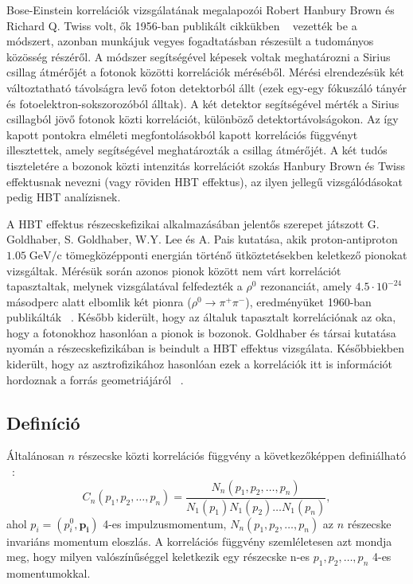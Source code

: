 \documentclass[10pt,a4paper]{article}
\numberwithin{equation}{subsection}
\numberwithin{figure}{section}
\begin{document}
Bose-Einstein korrelációk vizsgálatának megalapozói Robert Hanbury Brown és Richard Q. Twiss volt, ők 1956-ban publikált cikkükben ~\cite{HanburyBrown:1956bqd} vezették be a módszert, azonban munkájuk vegyes fogadtatásban részesült a tudományos közösség részéről. A módszer segítségével képesek voltak meghatározni a Sirius csillag átmérőjét a fotonok közötti korrelációk méréséből. Mérési elrendezésük két változtatható távolságra levő foton detektorból állt (ezek egy-egy fókuszáló tányér és fotoelektron-sokszorozóból álltak). A két detektor segítségével mérték a Sirius csillagból jövő fotonok közti korrelációt, különböző detektortávolságokon. Az így kapott pontokra elméleti megfontolásokból kapott korrelációs függvényt illesztettek, amely segítségével meghatározták a csillag átmérőjét. A két tudós tiszteletére a bozonok közti intenzitás korrelációt szokás Hanbury Brown és Twiss effektusnak nevezni (vagy röviden HBT effektus), az ilyen jellegű vizsgálódásokat pedig HBT analízisnek.

A HBT effektus részecskefizikai alkalmazásában jelentős szerepet játszott G. Goldhaber, S. Goldhaber, W.Y. Lee és A. Pais kutatása, akik proton-antiproton $1.05\;\mathrm{GeV/c}$ tömegközépponti energián történő ütköztetésekben keletkező pionokat vizsgáltak. Mérésük során azonos pionok között nem várt korrelációt tapasztaltak, melynek vizsgálatával felfedezték a $\rho^0$ rezonanciát, amely $4.5\cdot 10^{-24}$ másodperc alatt elbomlik két pionra ($\rho^0\rightarrow \pi^+\pi^-$), eredményüket 1960-ban publikálták ~\cite{Goldhaber:1960sf}. Később kiderült, hogy az általuk tapasztalt korrelációnak az oka, hogy a fotonokhoz hasonlóan a pionok is bozonok. Goldhaber és társai kutatása nyomán a részecskefizikában is beindult a HBT effektus vizsgálata. Későbbiekben kiderült, hogy az asztrofizikához hasonlóan ezek a korrelációk itt is információt hordoznak a forrás geometriájáról ~\cite{Padula:2004ba, CsanadHabil}. 


\subsection{Definíció}

Általánosan $n$ részecske közti korrelációs függvény a következőképpen definiálható ~\cite{Alt:1999cs, Csorgo:1999sj}:
\begin{equation}
C_n(p_1, p_2, \dots, p_n)=\frac{ N_n(p_1, p_2, \dots, p_n)  }{ N_1(p_1)N_1(p_2)\dots N_1(p_n)},
\label{eq:Cn}
\end{equation}
ahol $p_i=(p_i^0, \bm{p_i})$ 4-es impulzusmomentum, $ N_n(p_1, p_2, \dots, p_n)$ az $n$ részecske invariáns momentum eloszlás. A korrelációs függvény szemléletesen azt mondja meg, hogy milyen valószínűséggel keletkezik egy részecske n-es $p_1, p_2, \dots, p_n$ 4-es momentumokkal.
\end{document}
